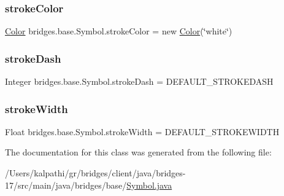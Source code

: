 \subsubsection{\texorpdfstring{stroke\+Color}{strokeColor}}
{\footnotesize\ttfamily \mbox{\hyperlink{classbridges_1_1base_1_1_color}{Color}} bridges.\+base.\+Symbol.\+stroke\+Color = new \mbox{\hyperlink{classbridges_1_1base_1_1_color}{Color}}(\char`\"{}white\char`\"{})\hspace{0.3cm}{\ttfamily [protected]}}

\mbox{\label{classbridges_1_1base_1_1_symbol_a04134e835474c4747e334389f00513c0}} 
\subsubsection{\texorpdfstring{stroke\+Dash}{strokeDash}}
{\footnotesize\ttfamily Integer bridges.\+base.\+Symbol.\+stroke\+Dash = D\+E\+F\+A\+U\+L\+T\+\_\+\+S\+T\+R\+O\+K\+E\+D\+A\+SH\hspace{0.3cm}{\ttfamily [protected]}}

\mbox{\label{classbridges_1_1base_1_1_symbol_a9f90a6efb9cb7a2f4e38c46862ae5a95}} 
\subsubsection{\texorpdfstring{stroke\+Width}{strokeWidth}}
{\footnotesize\ttfamily Float bridges.\+base.\+Symbol.\+stroke\+Width = D\+E\+F\+A\+U\+L\+T\+\_\+\+S\+T\+R\+O\+K\+E\+W\+I\+D\+TH\hspace{0.3cm}{\ttfamily [protected]}}



The documentation for this class was generated from the following file\+:\begin{DoxyCompactItemize}
\item 
/\+Users/kalpathi/gr/bridges/client/java/bridges-\/17/src/main/java/bridges/base/\mbox{\hyperlink{_symbol_8java}{Symbol.\+java}}\end{DoxyCompactItemize}
